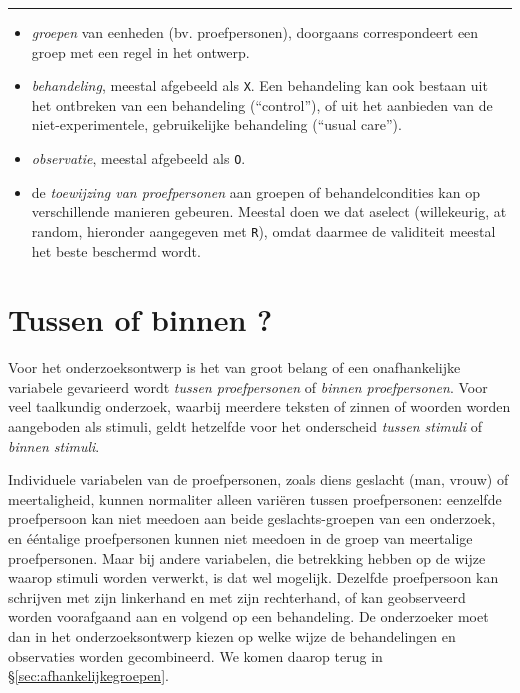 \documentclass[
]{book}
\begin{document}
\begin{center}\rule{0.5\linewidth}{0.5pt}\end{center}

\begin{itemize}
\item
  \emph{groepen} van eenheden (bv. proefpersonen), doorgaans correspondeert
  een groep met een regel in het ontwerp.
\item
  \emph{behandeling}, meestal afgebeeld als \texttt{X}. Een behandeling kan ook
  bestaan uit het ontbreken van een behandeling (``control''), of uit
  het aanbieden van de niet-experimentele, gebruikelijke behandeling
  (``usual care'').
\item
  \emph{observatie}, meestal afgebeeld als \texttt{O}.
\item
  de \emph{toewijzing van proefpersonen} aan groepen of behandelcondities
  kan op verschillende manieren gebeuren. Meestal doen we dat aselect
  (willekeurig, at random, hieronder aangegeven met \texttt{R}), omdat
  daarmee de validiteit meestal het beste beschermd wordt.
\end{itemize}

\hypertarget{sec:tussenbinnenproefpersonen}{%
\section{Tussen of binnen ?}\label{sec:tussenbinnenproefpersonen}}

Voor het
onderzoeksontwerp is het van groot belang of een onafhankelijke variabele
gevarieerd wordt \emph{tussen proefpersonen} of \emph{binnen proefpersonen}. Voor
veel taalkundig onderzoek, waarbij meerdere teksten of zinnen of woorden
worden aangeboden als stimuli, geldt hetzelfde voor het onderscheid
\emph{tussen stimuli} of \emph{binnen stimuli}.

Individuele variabelen van de proefpersonen, zoals diens geslacht
(man, vrouw) of meertaligheid, kunnen normaliter alleen variëren
tussen proefpersonen: eenzelfde proefpersoon kan niet meedoen aan beide
geslachts-groepen van een onderzoek, en ééntalige proefpersonen kunnen
niet meedoen in de groep van meertalige proefpersonen. Maar bij andere
variabelen, die betrekking hebben op de wijze waarop stimuli worden
verwerkt, is dat wel mogelijk. Dezelfde proefpersoon kan schrijven met
zijn linkerhand en met zijn rechterhand, of kan geobserveerd worden
voorafgaand aan en volgend op een behandeling. De onderzoeker moet dan
in het onderzoeksontwerp kiezen op welke wijze de behandelingen en
observaties worden gecombineerd. We komen daarop terug in
§\ref{sec:afhankelijkegroepen}.
\end{document}
